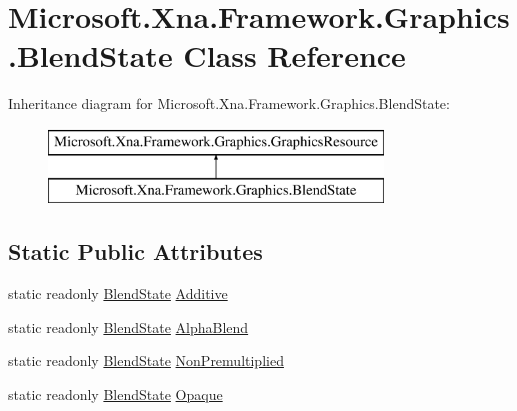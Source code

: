 \hypertarget{class_microsoft_1_1_xna_1_1_framework_1_1_graphics_1_1_blend_state}{}\section{Microsoft.\+Xna.\+Framework.\+Graphics.\+Blend\+State Class Reference}
\label{class_microsoft_1_1_xna_1_1_framework_1_1_graphics_1_1_blend_state}
Inheritance diagram for Microsoft.\+Xna.\+Framework.\+Graphics.\+Blend\+State\+:\begin{figure}[H]
\begin{center}
\leavevmode
\includegraphics[height=2.000000cm]{class_microsoft_1_1_xna_1_1_framework_1_1_graphics_1_1_blend_state}
\end{center}
\end{figure}
\subsection*{Static Public Attributes}
\begin{DoxyCompactItemize}
\item 
static readonly \hyperlink{class_microsoft_1_1_xna_1_1_framework_1_1_graphics_1_1_blend_state}{Blend\+State} \hyperlink{class_microsoft_1_1_xna_1_1_framework_1_1_graphics_1_1_blend_state_ac9a9231ea1051a6b86287d7997631db0}{Additive}
\item 
static readonly \hyperlink{class_microsoft_1_1_xna_1_1_framework_1_1_graphics_1_1_blend_state}{Blend\+State} \hyperlink{class_microsoft_1_1_xna_1_1_framework_1_1_graphics_1_1_blend_state_a3ba3d3b383c89406cad6e23f461e32f5}{Alpha\+Blend}
\item 
static readonly \hyperlink{class_microsoft_1_1_xna_1_1_framework_1_1_graphics_1_1_blend_state}{Blend\+State} \hyperlink{class_microsoft_1_1_xna_1_1_framework_1_1_graphics_1_1_blend_state_a3e766ba82fbaefab9571509d4a51319c}{Non\+Premultiplied}
\item 
static readonly \hyperlink{class_microsoft_1_1_xna_1_1_framework_1_1_graphics_1_1_blend_state}{Blend\+State} \hyperlink{class_microsoft_1_1_xna_1_1_framework_1_1_graphics_1_1_blend_state_a18cd0e96d0f213101fa1d90ac120b43c}{Opaque}
\end{DoxyCompactItemize}
